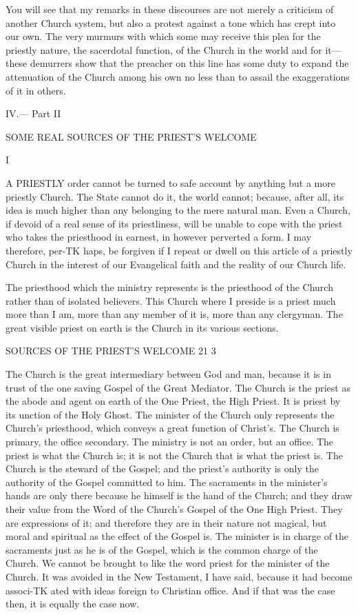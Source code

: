 \documentclass[12pt,a5paper,twoside]{book}
\begin{document}
{{You will see that my remarks in these discourses 
are not merely a criticism of another Church system, 
but also a protest against a tone which has crept into 
our own. The very murmurs with which some may 
receive this plea for the priestly nature, the sacerdotal 
function, of the Church in the world and for it---these 
demurrers show that the preacher on this line has 
some duty to expand the attenuation of the Church 
among his own no less than to assail the exaggerations 
of it in others. 



IV.— Part II 

SOME REAL SOURCES OF THE PRIEST'S 
WELCOME 

I 

A PRIESTLY order cannot be turned to safe account 
by anything but a more priestly Church. The State 
cannot do it, the world cannot; because, after all, 
its idea is much higher than any belonging to the 
mere natural man. Even a Church, if devoid of a 
real sense of its priestliness, will be unable to cope 
with the priest who takes the priesthood in earnest, 
in however perverted a form. I may therefore, per-TK
haps, be forgiven if I repeat or dwell on this article 
of a priestly Church in the interest of our Evangelical 
faith and the reality of our Church life. 

The priesthood which the ministry represents is 
the priesthood of the Church rather than of isolated 
believers. This Church where I preside is a priest 
much more than I am, more than any member of 
it is, more than any clergyman. The great visible 
priest on earth is the Church in its various sections. 



SOURCES OF THE PRIEST'S WELCOME 21 3 

The Church is the great intermediary between God 
and man, because it is in trust of the one saving 
Gospel of the Great Mediator. The Church is the 
priest as the abode and agent on earth of the One 
Priest, the High Priest. It is priest by its unction 
of the Holy Ghost. The minister of the Church 
only represents the Church's priesthood, which conveys 
a great function of Christ's. The Church is primary, 
the office secondary. The ministry is not an order, 
but an office. The priest is what the Church is; 
it is not the Church that is what the priest is. 
The Church is the steward of the Gospel; and the 
priest's authority is only the authority of the Gospel 
committed to him. The sacraments in the minister's 
hands are only there because he himself is the hand 
of the Church; and they draw their value from the 
Word of the Church's Gospel of the One High 
Priest. They are expressions of it; and therefore 
they are in their nature not magical, but moral and 
spiritual as the effect of the Gospel is. The minister 
is in charge of the sacraments just as he is of the 
Gospel, which is the common charge of the Church. 
We cannot be brought to like the word priest for the 
minister of the Church. It was avoided in the New 
Testament, I have said, because it had become associ-TK
ated with ideas foreign to Christian office. And if 
that was the case then, it is equally the case now. 



}}
\end{document}
